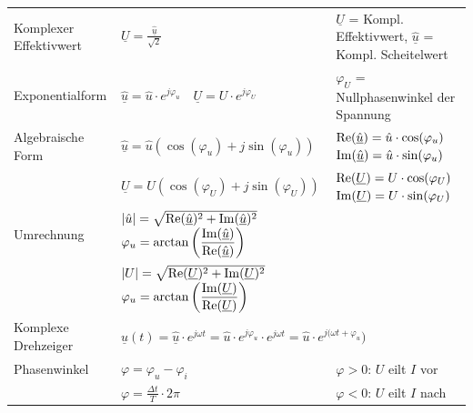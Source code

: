 	\begin{tabular}{p{4.0cm}p{5.5cm}p{8.5cm}}
       	Komplexer Effektivwert &
       		$\underline{U} = \frac{\underline{\hat{u}}}{\sqrt{2}}$ &
       		$\underline{U}$ = Kompl. Effektivwert, $\underline{\hat{u}}$ = Kompl. Scheitelwert \\
			Exponentialform &
			$\underline{\hat{u}} = \hat{u} \cdot e^{j\varphi_u} \quad \underline{U} = U \cdot e^{j\varphi_U}$  &
			$\varphi_U$ = Nullphasenwinkel der Spannung\\
			Algebraische Form &
			$\underline{\hat{u}} = \hat{u} (\cos(\varphi_u)+j\sin(\varphi_u))$ &
			$\operatorname{Re}(\underline{\hat{u}}) = \hat{u} \cdot \cos(\varphi_u)$ \quad $\operatorname{Im}(\underline{\hat{u}}) = \hat{u} \cdot \sin(\varphi_u)$ \\
			&	$\underline{U} = U (\cos(\varphi_U)+j\sin(\varphi_U))$ &
			$\operatorname{Re}(\underline{U}) = U \cdot \cos(\varphi_U)$ \quad $\operatorname{Im}(\underline{U}) = U \cdot \sin(\varphi_U)$ \\
			Umrechnung &
			$|\hat{u}| = \sqrt{\operatorname{Re}(\underline{\hat{u}})^2 + \operatorname{Im}(\underline{\hat{u}})^2}$ \break $\varphi_u = \arctan\left(\dfrac{\operatorname{Im}(\underline{\hat{u}})}{\operatorname{Re}(\underline{\hat{u}})}\right)$ \\
			&	$|U| = \sqrt{\operatorname{Re}(\underline{U})^2 + 		\operatorname{Im}(\underline{U})^2}$ \break
			$\varphi_u = \arctan\left(\dfrac{\operatorname{Im}(\underline{U})}{\operatorname{Re}(\underline{U})}\right)$ \\
			Komplexe Drehzeiger & 	
			\multicolumn{2}{l}{$\underline{u}(t) = \underline{\hat{u}} \cdot e^{j\omega t} = \hat{u} \cdot e^{j\varphi_u} \cdot e^{j\omega t} = \hat{u} \cdot e^{j(\omega t + \varphi_u})$} \\
			Phasenwinkel & 
			$\varphi = \varphi_u - \varphi_i$ &
			$\varphi > 0$: $U$ eilt $I$ vor\\ 
			& 	$\varphi = \frac{\Delta t}{T}\cdot 2\pi$ &
			$\varphi < 0$: $U$ eilt $I$ nach\\
		\end{tabular}
